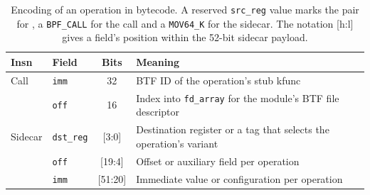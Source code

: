 \begin{table}[t]
\centering
\small
\caption{Encoding of an operation in bytecode. A reserved \texttt{src\_reg} value marks the pair for \tool, a \texttt{BPF\_CALL} for the call and a \texttt{MOV64\_K} for the sidecar. The notation [h:l] gives a field's position within the 52-bit sidecar payload.}
\label{tab:encoding}
\begin{tabular}{@{}llcp{}@{}}
\toprule
Insn & Field & Bits & Meaning \tabularnewline
\midrule
Call & \texttt{imm} & 32 & \raggedright BTF ID of the operation's stub kfunc \tabularnewline
 & \texttt{off} & 16 & \raggedright Index into \texttt{fd\_array} for the module's BTF file descriptor \tabularnewline
\midrule
Sidecar & \texttt{dst\_reg} & [3:0] & \raggedright Destination register or a tag that selects the operation's variant \tabularnewline
 & \texttt{off} & [19:4] & \raggedright Offset or auxiliary field per operation \tabularnewline
 & \texttt{imm} & [51:20] & \raggedright Immediate value or configuration per operation \tabularnewline
\bottomrule
\end{tabular}
\end{table}